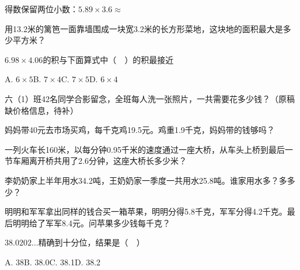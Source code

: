 \vspace{5cm}
\begin{mistake}
得数保留两位小数：$5.89\times3.6\approx$
\end{mistake}

\vspace{5cm}
\begin{mistake}
用13.2米的篱笆一面靠墙围成一块宽3.2米的长方形菜地，这块地的面积最大是多少平方米？
\end{mistake}

\vspace{5cm}
\begin{mistake}
$6.98\times4.06$的积与下面算式中（$\quad$）的积最接近

A. $6\times5$\quad B. $7\times4$\quad C. $7\times5$\quad D. $6\times4$
\end{mistake}

\vspace{5cm}
\begin{mistake}
六（1）班42名同学合影留念，全班每人洗一张照片，一共需要花多少钱？（原稿缺价格信息，待补）
\end{mistake}

\vspace{5cm}
\begin{mistake}
妈妈带40元去市场买鸡，每千克鸡19.5元。鸡重1.9千克，妈妈带的钱够吗？
\end{mistake}

\vspace{5cm}
\begin{mistake}
一列火车长160米，以每分钟0.95千米的速度通过一座大桥，从车头上桥到最后一节车厢离开桥共用了2.6分钟，这座大桥长多少米？
\end{mistake}

\vspace{5cm}
\begin{mistake}
李奶奶家上半年用水34.2吨，王奶奶家一季度一共用水25.8吨。谁家用水多？多多少？
\end{mistake}

\vspace{5cm}
\begin{mistake}
明明和军军拿出同样的钱合买一箱苹果，明明分得5.8千克，军军分得4.2千克。最后明明给了军军8.4元。问苹果多少钱每千克？
\end{mistake}

\vspace{5cm}
\begin{mistake}
$38.0202\ldots$精确到十分位，结果是（$\quad$）

A. 38\quad B. 38.0\quad C. 38.1\quad D. 38.2
\end{mistake}

